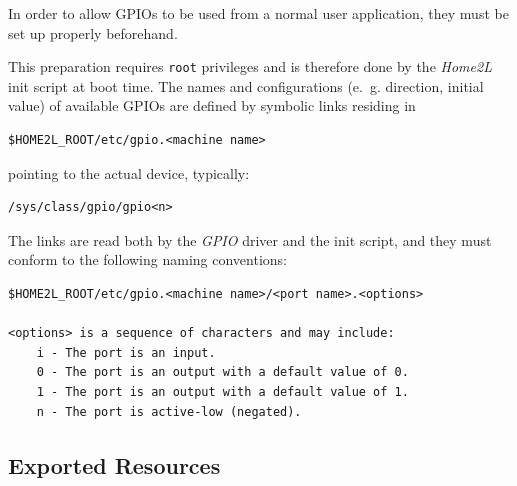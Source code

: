 \documentclass[12pt,english,parskip=half]{scrreprt}
\begin{document}
In order to allow GPIOs to be used from a normal user application, they
must be set up properly beforehand.

This preparation requires \texttt{root} privileges and is therefore
done by the \emph{Home2L} init script at boot time.
The names and configurations (e.~g. direction, initial
value) of available GPIOs are defined by symbolic links residing in

\begin{lstlisting}
$HOME2L_ROOT/etc/gpio.<machine name>
\end{lstlisting}

pointing to the actual device, typically:

\begin{lstlisting}
/sys/class/gpio/gpio<n>
\end{lstlisting}

The links are read both by the \emph{GPIO} driver and the init script,
and they must conform to the following naming conventions:

\begin{lstlisting}
$HOME2L_ROOT/etc/gpio.<machine name>/<port name>.<options>

<options> is a sequence of characters and may include:
    i - The port is an input.
    0 - The port is an output with a default value of 0.
    1 - The port is an output with a default value of 1.
    n - The port is active-low (negated).
\end{lstlisting}





%
%
%
%





\subsection{Exported Resources}
\label{sec:drvlib-gpio-rc}
\end{document}
